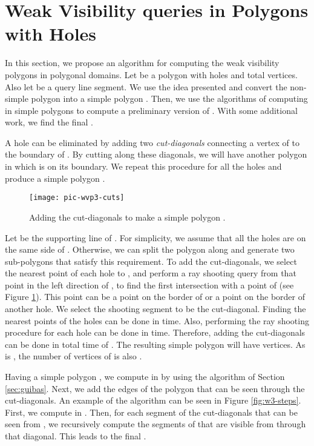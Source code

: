 \documentclass[5p]{elsarticle}
\begin{document}
\section{Weak Visibility queries in Polygons with Holes}
\label{sec:holes}
In this section, we propose an algorithm for 
computing the weak visibility polygons in polygonal domains. 
Let  be a polygon with  holes and  total vertices.
Also let  be a query line segment. 
We use the idea presented \cite{zarei} and convert the non-simple 
polygon  into a simple polygon . Then, we use the algorithms of computing  in 
simple polygons to compute a preliminary version of . With some additional work, 
we find the final .

A hole  can be eliminated by adding two {\em cut-diagonals} connecting a vertex of 
 to the boundary of . By cutting  along these diagonals, we will
have another polygon in which  is on its boundary.
We repeat this procedure for all the holes and produce a simple polygon .


\begin{figure}[h]
  \centering
  \texttt{[image: pic-wvp3-cuts]}
  \caption{Adding the cut-diagonals to make a simple polygon .}
  \label{fig:wvp3-cuts}
\end{figure}

Let  be the supporting line of .
For simplicity, we assume that all the holes are on the same side of . Otherwise, we can
split the polygon along  and generate two sub-polygons that satisfy this requirement.
To add the cut-diagonals, we select the nearest point of each hole
to , and perform a ray shooting query from that point in the left direction of ,
to find the first intersection with a point of  (see Figure \ref{fig:wvp3-cuts}). 
This point can be a point on the border of 
or a point on the border of another hole. We select the shooting segment to be the cut-diagonal.
Finding the nearest points of the holes can be done in  time. Also,
performing the ray shooting procedure for each hole can be done in  time.
Therefore, adding the cut-diagonals can be done in total time of .
The resulting simple polygon will have  vertices.
As  is , the number of vertices of  is also .






Having a simple polygon , we compute  in  by using
the algorithm of Section \ref{sec:guibas}.
Next, we add the edges of the polygon that can be seen through the cut-diagonals.
An example of the algorithm can be seen in Figure \ref{fig:w3-steps}.
First, we compute  in . Then, for each segment of the cut-diagonals
that can be seen from , we recursively compute the segments of  that are visible 
from  through that diagonal. This leads to the final .
\end{document}

